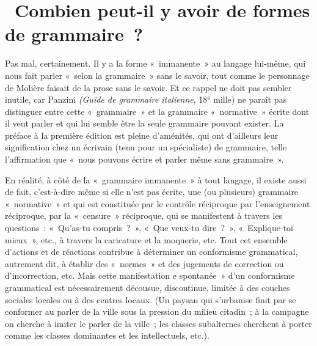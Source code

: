 \documentclass[french,twoside]{book} %
\begin{document}
\section[{ Combien peut-il y avoir de formes de grammaire ?}]{ Combien peut-il y avoir de formes de grammaire ?}
\noindent Pas mal, certainement. Il y a la forme « immanente » au langage lui-même, qui nous fait parler « selon la grammaire » sans le savoir, tout comme le personnage de Molière faisait de la prose sans le savoir. Et ce rappel ne doit pas sembler inutile, car Panzini \emph{(Guide de grammaire italienne}, 18° mille) ne paraît pas distinguer entre cette « grammaire » et la grammaire « normative » écrite dont il veut parler et qui lui semble être la seule grammaire pouvant exister. La préface à la première édition est pleine d’aménités, qui ont d’ailleurs leur signification chez un écrivain (tenu pour un spécialiste) de grammaire, telle l’affirmation que « nous pouvons écrire et parler même sans grammaire ».\par
En réalité, à côté de la « grammaire immanente » à tout langage, il existe aussi de fait, c’est-à-dire même si elle n’est pas écrite, une (ou plusieurs) grammaire « normative » et qui est constituée par le contrôle réciproque par l’enseignement réciproque, par la « censure » réciproque, qui se manifestent à travers les questions : « Qu'as-tu compris ? », « Que veux-tu dire ? », « Explique-toi mieux », etc., à travers la caricature et la moquerie, etc. Tout cet ensemble d’actions et de réactions contribue à déterminer un conformisme grammatical, autrement dit, à établir des « normes » et des jugements de correction ou d’incorrection, etc. Mais cette manifestation e spontanée » d’un conformisme grammatical est nécessairement décousue, discontinue, limitée à des couches sociales locales ou à des centres locaux. (Un paysan qui s’urbanise finit par se conformer au parler de la ville sous la pression du milieu citadin ; à la campagne on cherche à imiter le parler de la ville ; les classes subalternes cherchent à porter comme les classes dominantes et les intellectuels, etc.).\par
\end{document}
